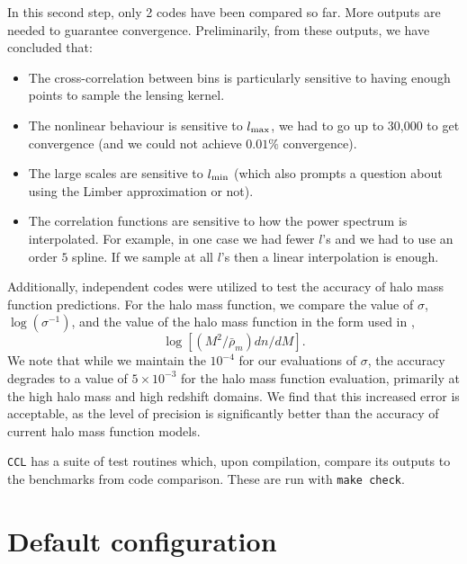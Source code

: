 \documentclass[\docopts]{\docclass}
\begin{document}
In this second step, only 2 codes have been compared so far. More outputs are needed to guarantee convergence. Preliminarily, from these outputs, we have concluded that:
\begin{itemize}
\item The cross-correlation between bins is particularly sensitive to having enough points to sample the lensing kernel. 
\item The nonlinear behaviour is sensitive to $l_{\rm max}$, we had to go up to 30,000 to get convergence (and we could not achieve $0.01\%$ convergence).
\item The large scales are sensitive to $l_{\rm min}$ (which also prompts a question about using the Limber approximation or not).
\item The correlation functions are sensitive to how the power spectrum is interpolated. For example, in one case we had fewer $l$'s and we had to use an order $5$ spline. If we sample at all $l$'s then a linear interpolation is enough.
\end{itemize}

Additionally, independent codes were utilized to test the accuracy of halo mass function predictions. For the halo mass function, we compare the value of $\sigma$, $\log(\sigma^{-1})$, and the value of the halo mass function in the form used in \citep{Tinker2008},
\begin{equation}
\log[(M^2/\bar{\rho}_m)dn/dM].
\end{equation}
We note that while we maintain the $10^{-4}$ for our evaluations of $\sigma$, the accuracy degrades to a value of $5\times10^{-3}$ for the halo mass function evaluation, primarily at the high halo mass and high redshift domains. We find that this increased error is acceptable, as the level of precision is significantly better than the accuracy of current halo mass function models. 

{\tt CCL} has a suite of test routines which, upon compilation, compare its outputs to the benchmarks from code comparison. These are run with {\tt make check}.


\section{Default configuration}
\label{sec:default}
\end{document}
